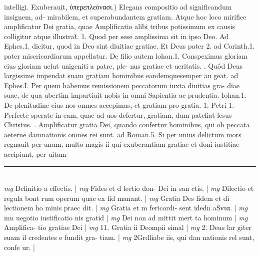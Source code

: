 \documentclass{article}
\begin{document}
\begin{pages}
intelligi.  \pend\pstart Exuberauit, ὑπερεπλεόνασι.) Elegans compositio ad significandum insignem, ad- mirabilem, et superabundantem gratiam. Atque hoc loco mirifice amplificatur Dei gratia, quae Amplificatio alibi tribus potissimum ex causis colligitur atque illustrat̃. 1. Quod per sese amplissima sit in ipso Deo. Ad Ephes.1. dicitur, quod in Deo sint diuitiae gratiae. Et Deus pater 2. ad Corinth.1. pater misericordiarum appellatur. De filio autem lohan.1. Conspeximus gloriam eius gloriam uelut unigeniti a patre, ple- nus gratiae et ueritatis.  \pend{}. Quôd Deus largissime impendat suam gratiam hominibus eandemquesemper au geat. ad Ephes.I. Per quem habemus remissionem peccatorum iuxta diuitias gra- diae suae, de qua ubertim impartiuit nobis in omni Sapientia ac prudentia. Iohan.1. De plenitudine eius nos omnes accepimus, et gratiam pro gratia. 1. Petri 1. Perfecte sperate in eam, quae ad uos defertur, gratiam, dum patefiat lesus Christus.  \pend{}. Amplificatur gratia Dei, quando confertur hominibus, qui ob peccata aeterne damnationis omnes rei sunt. ad Roman.5. Si per unius delictum mors regnauit per unum, multo magis ii qui exuberantiam gratiae et doni iustitiae accipiunt, per uitam  \pend
\vspace{0.5cm}\noindent
\vspace{0.2cm}\rule{1cm}{0.2pt}\\ 
\hspace{0.2cm}\textit{mg}
\footnotesize Definitio a effectis. 
\normalsize| 
\hspace{0.2cm}\textit{mg}
\footnotesize Fides et d lectio don- Dei in san ctis. 
\normalsize| 
\hspace{0.2cm}\textit{mg}
\footnotesize Dilectio et regula bont rum operum quae ex fid manant. 
\normalsize| 
\hspace{0.2cm}\textit{mg}
\footnotesize Gratia Des fidem et di lectionem ho minis praec dit. 
\normalsize| 
\hspace{0.2cm}\textit{mg}
\footnotesize Gratia et m fericordi- sent idedn aSντα. 
\normalsize| 
\hspace{0.2cm}\textit{mg}
\footnotesize mn uegotio iustificatio nis gratid 
\normalsize| 
\hspace{0.2cm}\textit{mg}
\footnotesize Dei non ad mittit mert ta hominum 
\normalsize| 
\hspace{0.2cm}\textit{mg}
\footnotesize Amplifica- tio gratiae Dei 
\normalsize| 
\hspace{0.2cm}\textit{mg}
\footnotesize 11. Gratia ii Deompii simal 
\normalsize| 
\hspace{0.2cm}\textit{mg}
\footnotesize 2. Deus lar giter suam il credentes e fundit gra- tiam. 
\normalsize| 
\hspace{0.2cm}\textit{mg}
\footnotesize 2Grdliabe iis, qui dan nationis rel sunt, confe ur. 
\normalsize| 

\end{pages}
\end{document}
